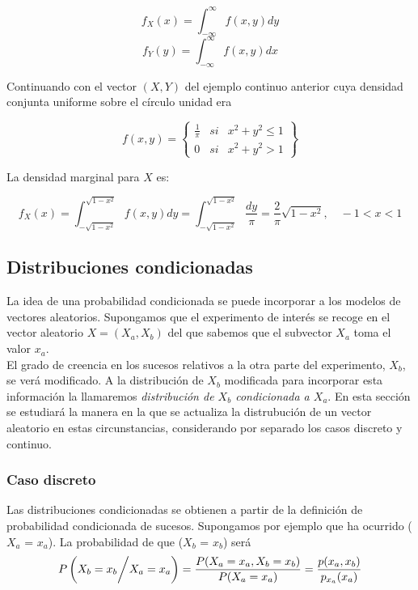 \documentclass{article}
\begin{document}
\[ f_{X}(x) = \int_{-\infty}^{\infty} f(x, y)dy \]
\[ f_{Y}(y) = \int_{-\infty}^{\infty} f(x, y)dx \]

\begin{theorem}
    Continuando con el vector $(X, Y)$ del ejemplo continuo anterior cuya densidad conjunta uniforme sobre el 
    círculo unidad era

    \[f(x, y) = \left\{
        \begin{array}{rcr}
            \frac{1}{\pi}   & si    & x^2 + y^2 \leq 1 \\
            0               & si    & x^2 + y^2 > 1
        \end{array}
    \right\}\]

    La densidad marginal para $X$ es:

    \[ f_{X}(x) = \int_{-\sqrt{1 - x^2}}^{\sqrt{1 - x^2}} f(x, y) dy = \int_{-\sqrt{1 - x^2}}^{\sqrt{1 - x^2}} \frac{dy}{\pi} = \frac{2}{\pi} \sqrt{1 - x^2}, \quad -1 < x < 1 \]

\end{theorem}

\subsection{Distribuciones condicionadas}

La idea de una probabilidad condicionada se puede incorporar a los modelos de vectores aleatorios. Supongamos que el experimento
de interés se recoge en el vector aleatorio $X = (X_a, X_b)$ del que sabemos que el subvector $X_a$ toma el valor $x_a$. \\
El grado de creencia en los sucesos relativos a la otra parte del experimento, $X_b$, se verá modificado. A la distribución de $X_b$
modificada para incorporar esta información la llamaremos \textit{distribución de $X_b$ condicionada a $X_a$}.
En esta sección se estudiará la manera en la que se actualiza la distrubución de un vector aleatorio en estas circunstancias, 
considerando por separado los casos discreto y continuo. 
\subsubsection{Caso discreto}
Las distribuciones condicionadas se obtienen a partir de la definición de probabilidad condicionada
de sucesos. Supongamos por ejemplo que ha ocurrido ($X_a$ = $x_a$). La probabilidad de que ($X_b$ = $x_b$)
será
\[ P\left( {X_{b} = x_{b}} \bigg{/} {X_{a} = x_{a}} \right) = \frac{P(X_{a} = x_{a}, X_{b} = x_{b})}{P(X_{a} = x_{a})} = \frac{p(x_{a}, x_{b})}{p_{x_{a}}(x_{a})} \]
\end{document}
